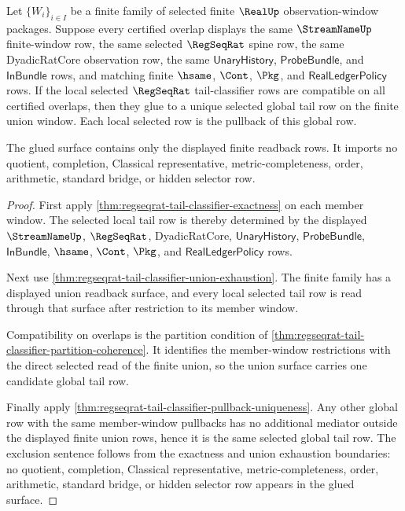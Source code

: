 \begin{theorem}
\label{thm:regseqrat-tail-classifier-finite-cover-sheaf}
Let $\{W_i\}_{i\in I}$ be a finite family of selected finite $\RealUp$
observation-window packages. Suppose every certified overlap displays the same
$\StreamNameUp$ finite-window row, the same selected $\RegSeqRat$ spine row, the
same DyadicRatCore observation row, the same $\mathsf{UnaryHistory}$,
$\mathsf{ProbeBundle}$, and $\mathsf{InBundle}$ rows, and matching finite
$\hsame$, $\Cont$, $\Pkg$, and $\mathsf{RealLedgerPolicy}$ rows. If the local
selected $\RegSeqRat$ tail-classifier rows are compatible on all certified
overlaps, then they glue to a unique selected global tail row on the finite
union window. Each local selected row is the pullback of this global row.

The glued surface contains only the displayed finite readback rows. It imports
no quotient, completion, Classical representative, metric-completeness, order,
arithmetic, standard bridge, or hidden selector row.
\end{theorem}
\begin{proof}
First apply \autoref{thm:regseqrat-tail-classifier-exactness} on each member
window. The selected local tail row is thereby determined by the displayed
$\StreamNameUp$, $\RegSeqRat$, DyadicRatCore, $\mathsf{UnaryHistory}$,
$\mathsf{ProbeBundle}$, $\mathsf{InBundle}$, $\hsame$, $\Cont$, $\Pkg$, and
$\mathsf{RealLedgerPolicy}$ rows.

Next use \autoref{thm:regseqrat-tail-classifier-union-exhaustion}. The finite
family has a displayed union readback surface, and every local selected tail row
is read through that surface after restriction to its member window.

Compatibility on overlaps is the partition condition of
\autoref{thm:regseqrat-tail-classifier-partition-coherence}. It identifies the
member-window restrictions with the direct selected read of the finite union, so
the union surface carries one candidate global tail row.

Finally apply \autoref{thm:regseqrat-tail-classifier-pullback-uniqueness}. Any
other global row with the same member-window pullbacks has no additional
mediator outside the displayed finite union rows, hence it is the same selected
global tail row. The exclusion sentence follows from the exactness and union
exhaustion boundaries: no quotient, completion, Classical representative,
metric-completeness, order, arithmetic, standard bridge, or hidden selector row
appears in the glued surface.
\end{proof}

